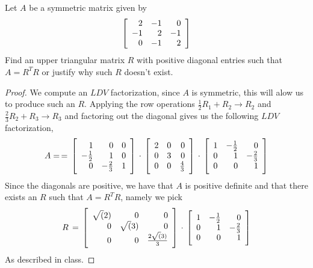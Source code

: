 \newpage 
\question 
Let $A$ be a symmetric matrix given by 
\begin{equation}
    \mat{rrr}
    2 & -1 & 0 \\ 
    -1 & 2 & -1 \\ 
    0 & -1 & 2
    \rix
\end{equation}
Find an upper triangular matrix $R$ with positive diagonal entries such that $A = R^TR$ or justify why such $R$ doesn't exist. 

\begin{proof}
    We compute an $LDV$ factorization, since $A$ is symmetric, this will alow us to produce such an $R$. Applying the row operations 
    $\frac{1}{2}R_1 + R_2 \to R_2$ and $\frac{2}{3}R_2 + R_3 \to R_3$ and factoring out the diagonal gives us the following $LDV$ factorization, 
    \begin{equation}
        A = \, = \, 
        \mat{rrr}
        1 & 0 & 0 \\ 
        -\frac{1}{2} & 1 & 0 \\
        0 & -\frac{2}{3} & 1 
        \rix 
        \, \cdot \, 
        \mat{rrr}
        2 & 0 & 0 \\ 
        0 & 3 & 0 \\
        0 & 0 & \frac{4}{3}
        \rix 
        \, \cdot \, 
        \mat{rrr}
        1 & -\frac{1}{2} & 0 \\ 
        0 & 1 & -\frac{2}{3} \\ 
        0 & 0 & 1 
        \rix
    \end{equation}
    Since the diagonals are positive, we have that $A$ is positive definite and that there exists an $R$ such that $A = R^TR$, namely we pick 
    \begin{equation}
        R \, = \, 
        \mat{rrr}
        \sqrt(2) & 0 & 0 \\ 
        0 & \sqrt(3) & 0 \\
        0 & 0 & \frac{2 \sqrt(3)}{3}
        \rix
        \, \cdot \, 
        \mat{rrr}
        1 & -\frac{1}{2} & 0 \\ 
        0 & 1 & -\frac{2}{3} \\ 
        0 & 0 & 1 
        \rix
    \end{equation}
    As described in class. 
\end{proof}
